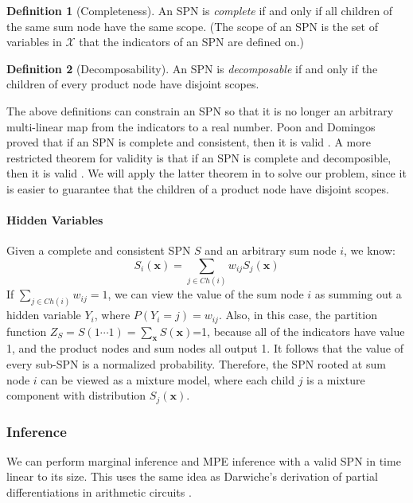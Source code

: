 \documentclass[10pt, titlepage]{article}
\theoremstyle{definition}
\newtheorem{definition}{Definition}[section]
\newcommand\mb{\mathbf}
\begin{document}
\begin{definition}[Completeness]
An SPN is \textit{complete} if and only if all children of the same sum node have the same scope. (The scope of an SPN is the set of variables in $\mathcal{X}$ that the indicators of an SPN are defined on.)
\end{definition}

\begin{definition}[Decomposability]
An SPN is \textit{decomposable} if and only if the children of every product node have disjoint scopes.
\end{definition}

The above definitions can constrain an SPN so that it is no longer an arbitrary multi-linear map from the indicators to a real number. Poon and Domingos proved that if an SPN is complete and consistent, then it is valid \cite{poon2011sum}. A more restricted theorem for validity is that if an SPN is complete and decomposible, then it is valid \cite{peharz2015theoretical}. We will apply the latter theorem in to solve our problem, since it is easier to guarantee that the children of a product node have disjoint scopes.

\paragraph{Hidden Variables}
Given a complete and consistent SPN $S$ and an arbitrary sum node $i$, we know:
\begin{equation}
S_i(\mb{x})=\sum_{j\in Ch(i)}w_{ij}S_j(\mb{x})
\end{equation}
If $\sum_{j\in Ch(i)}w_{ij}=1$, we can view the value of the sum node $i$ as summing out a hidden variable $Y_i$, where $P(Y_i=j)=w_{ij}$. Also, in this case, the partition function $Z_S=S(1\cdots1)=\sum_{\mb{x}}S(\mb{x})$=1, because all of the indicators have value 1, and the product nodes and sum nodes all output 1. It follows that the value of every sub-SPN is a normalized probability. Therefore, the SPN rooted at sum node $i$ can be viewed as a mixture model, where each child $j$ is a mixture component with distribution $S_j(\mb{x})$.

\subsubsection{Inference}\label{inf}
We can perform marginal inference and MPE inference with a valid SPN in time linear to its size. This uses the same idea as Darwiche's derivation of partial differentiations in arithmetic circuits \cite{darwiche2003differential}.
\end{document}
